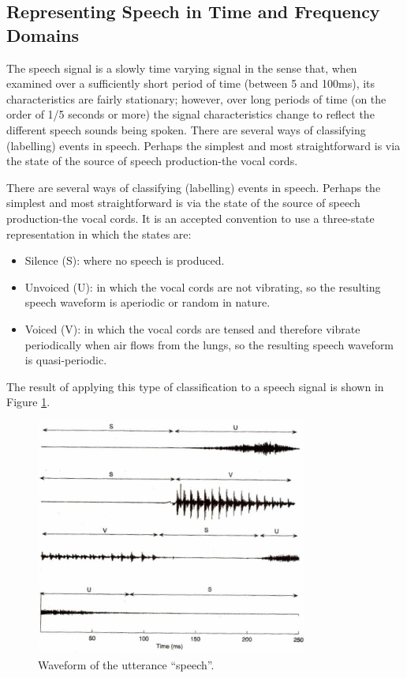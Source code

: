 \documentclass[12pt, a4paper, twoside]{report}
\begin{document}
\subsection{Representing Speech in Time and Frequency Domains}
The speech signal is a slowly time varying signal in the sense that, when examined over a sufficiently short period of time (between 5 and 100ms), its characteristics are fairly stationary; however, over long periods of time (on the order of 1/5 seconds or more) the signal characteristics change to reflect the different speech sounds being spoken. There are several ways of classifying (labelling) events in speech. Perhaps the simplest and most straightforward is via the state of the source of speech production-the vocal cords.
\par 
There are several ways of classifying (labelling) events in speech. Perhaps the simplest and most straightforward is via the state of the source of speech production-the vocal cords. It is an accepted convention to use a three-state representation in which the states are:
\begin{itemize}
\item Silence (S):  where no speech is produced.
\item Unvoiced (U): in which the vocal cords are not vibrating, so the resulting speech waveform is aperiodic or random in nature.
\item Voiced (V): in which the vocal cords are tensed and therefore vibrate periodically when air flows from the lungs, so the resulting speech waveform is quasi-periodic.
\end{itemize}
The result of applying this type of classification to a speech signal is shown in Figure \ref{fig:wave-utterance-speech}.

\begin{figure}[ht]
	\centering
	\includegraphics[width=0.8\textwidth]
	{images/chapter2/wave-utterance-speech}
	\caption{Waveform of the utterance ``speech''.}
	\label{fig:wave-utterance-speech}
\end{figure}
\end{document}
